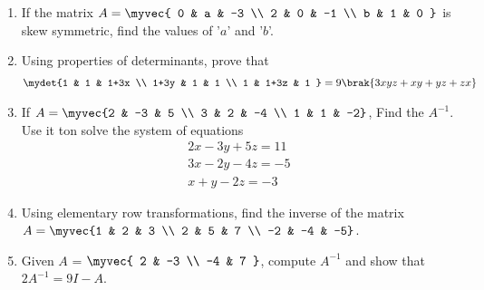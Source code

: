\begin{enumerate}
\item  If the matrix $A = \myvec{ 0 & a & -3 \\ 2 & 0 & -1 \\ b & 1 & 0 }$ is skew symmetric, find the values of '$a$' and '$b$'.

\item Using properties of determinants, prove that 
	\begin{align*}
		\mydet{1 & 1 & 1+3x \\ 1+3y & 1 & 1 \\ 1 & 1+3z & 1 }=9\brak{3xyz+xy+yz+zx}
	\end{align*}
\item If $A=\myvec{2 & -3 & 5 \\ 3 & 2 & -4 \\ 1 & 1 & -2}$, Find the $A^{-1}$. Use it ton solve the system of equations 
	\begin{align*}
		2x-3y+5z=11 \\
		3x-2y-4z=-5\\
		x+y-2z=-3
	\end{align*}
\item Using elementary row transformations, find the inverse of the matrix $A=\myvec{1 & 2 & 3 \\ 2 & 5 & 7 \\ -2 & -4 & -5}$.
\item Given $A$ = $\myvec{ 2 & -3 \\ -4 & 7 }$, compute $A^{-1}$ and show that $2A^{-1} = 9I-A$.


\end{enumerate}
